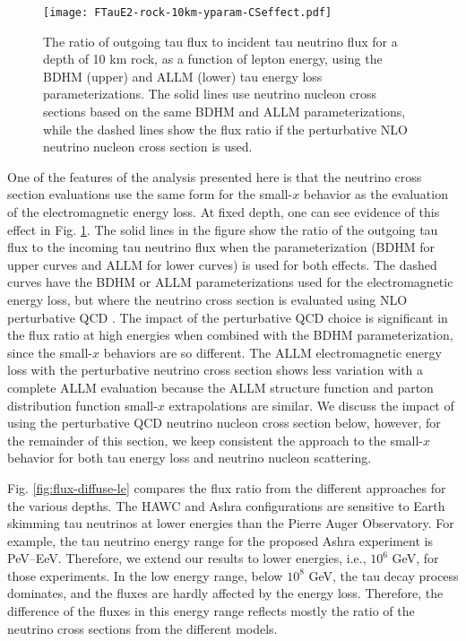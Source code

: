 \documentclass[aps,10pt,twocolumn,tightenlines]{revtex4-1}
\begin{document}
\begin{figure}[htb]
\centering
	\texttt{[image: FTauE2-rock-10km-yparam-CSeffect.pdf]}
	\caption{The ratio of outgoing tau flux to incident tau neutrino flux for a depth of 10 km rock, as a function of lepton energy, using the BDHM (upper) and ALLM (lower) tau energy loss parameterizations. The solid lines use neutrino nucleon cross sections based on the same BDHM and ALLM parameterizations, while the dashed lines show the flux ratio if the perturbative NLO neutrino nucleon cross section is used.}
	\label{fig:sigJR}
\end{figure}

One of the features of the analysis presented here is that the neutrino cross section evaluations 
use the same form for the small-$x$ 
behavior as the evaluation of the electromagnetic energy loss. At fixed depth, one can see evidence of this effect in 
Fig. \ref{fig:sigJR}. The solid lines in the figure show the ratio of the outgoing tau flux to the incoming tau neutrino flux when the parameterization (BDHM for upper curves and ALLM for lower curves) is used for both effects. The dashed curves have the BDHM or ALLM parameterizations used for the electromagnetic energy loss, but where the neutrino cross section is evaluated using NLO perturbative QCD \cite{Jeong:2010za}. The impact of the perturbative QCD choice is significant in the flux ratio at high energies when combined with the BDHM parameterization, since the small-$x$ behaviors are so different. The ALLM electromagnetic energy loss with the perturbative neutrino cross section shows less variation with a complete ALLM evaluation because the ALLM structure function and parton distribution function small-$x$ extrapolations are similar.  
We discuss the impact of using the perturbative QCD neutrino nucleon cross section below, however, for the remainder of this section, we keep consistent the 
approach to the small-$x$ behavior for both tau energy loss and neutrino nucleon scattering.


Fig. \ref{fig:flux-diffuse-le} compares the flux ratio from the different approaches for the various depths. 
The HAWC \cite{Vargas:2016hcp} and Ashra \cite{Asaoka:2012em} configurations are sensitive to 
Earth skimming tau neutrinos at lower energies than the Pierre Auger Observatory. 
For example, the tau neutrino energy range for the proposed Ashra experiment is PeV--EeV.
Therefore, we extend our results to lower energies, i.e., $10^6$ GeV, 
 for those experiments.
In the low energy range, below $10^8$ GeV, the tau decay process dominates, 
and the fluxes are hardly affected by the energy loss. 
Therefore, the difference of the fluxes in this energy range 
reflects mostly the ratio of the neutrino cross sections from the 
different models.  
%
\end{document}
